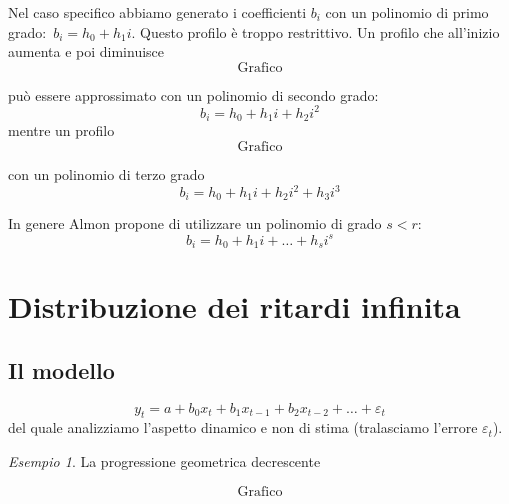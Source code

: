 \documentclass[a4paper]{report}
\newcounter{ese}
\theoremstyle{remark}
\newtheorem{esempio}[ese]{Esempio}
\newcounter{theor}
\begin{document}
\noindent Nel caso specifico abbiamo generato i coefficienti $b_{i}$ con un
polinomio di primo grado:\ $b_{i}=h_{0}+h_{1}i$. Questo profilo \`{e} troppo
restrittivo. Un profilo che all'inizio aumenta e poi diminuisce%
\begin{equation*}
\text{Grafico}
\end{equation*}%
\vspace{5cm}

\noindent pu\`{o} essere approssimato con un polinomio di secondo grado:%
\begin{equation*}
b_{i}=h_{0}+h_{1}i+h_{2}i^{2}
\end{equation*}%
mentre un profilo 
\begin{equation*}
\text{Grafico}
\end{equation*}%
\vspace{5cm}

\noindent con un polinomio di terzo grado 
\begin{equation*}
b_{i}=h_{0}+h_{1}i+h_{2}i^{2}+h_{3}i^{3}
\end{equation*}

\noindent In genere Almon propone di utilizzare un polinomio di grado $s<r$:%
\begin{equation*}
b_{i}=h_{0}+h_{1}i+\ldots +h_{s}i^{s}
\end{equation*}

\section{Distribuzione dei ritardi infinita}

\subsection{Il modello}

\begin{equation*}
y_{t}=a+b_{0}x_{t}+b_{1}x_{t-1}+b_{2}x_{t-2}+\ldots +\varepsilon _{t}
\end{equation*}%
del quale analizziamo l'aspetto dinamico e non di stima (tralasciamo
l'errore $\varepsilon _{t}$).

\begin{esempio}
\label{progressione geo}La progressione geometrica decrescente

\begin{equation*}
\text{Grafico}
\end{equation*}%
\vspace{5cm}
\end{esempio}
\end{document}
